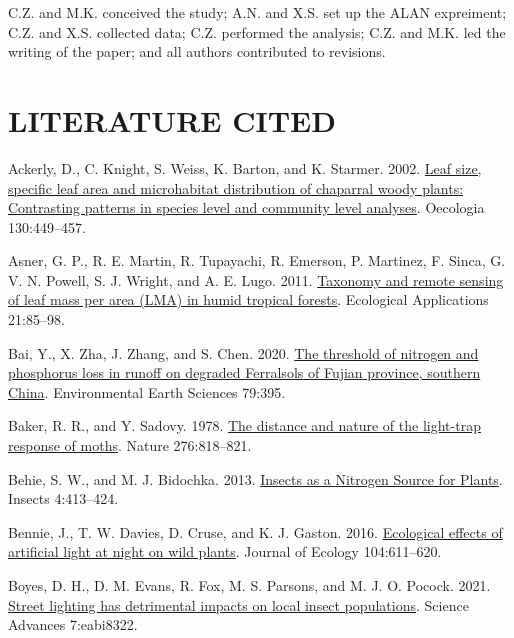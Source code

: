 \documentclass[
  12pt,
  letterpaper,
  DIV=11,
  numbers=noendperiod]{scrartcl}
\newlength{\cslhangindent}
\newlength{\cslentryspacingunit} %
\newenvironment{CSLReferences}[2] %
 {%
  \setlength{\parindent}{0pt}
  \ifodd #1
  \let\oldpar\par
  \def\par{\hangindent=\cslhangindent\oldpar}
  \fi
  \setlength{\parskip}{#2\cslentryspacingunit}
 }%
 {}
\begin{document}
C.Z. and M.K. conceived the study; A.N. and X.S. set up the ALAN
expreiment; C.Z. and X.S. collected data; C.Z. performed the analysis;
C.Z. and M.K. led the writing of the paper; and all authors contributed
to revisions.

\hypertarget{literature-cited}{%
\section{LITERATURE CITED}\label{literature-cited}}

\hypertarget{refs}{}
\begin{CSLReferences}{1}{0}
\leavevmode{}%
Ackerly, D., C. Knight, S. Weiss, K. Barton, and K. Starmer. 2002.
\href{https://doi.org/10.1007/s004420100805}{Leaf size, specific leaf
area and microhabitat distribution of chaparral woody plants:
Contrasting patterns in species level and community level analyses}.
Oecologia 130:449--457.

\leavevmode{}%
Asner, G. P., R. E. Martin, R. Tupayachi, R. Emerson, P. Martinez, F.
Sinca, G. V. N. Powell, S. J. Wright, and A. E. Lugo. 2011.
\href{https://doi.org/10.1890/09-1999.1}{Taxonomy and remote sensing of
leaf mass per area ({LMA}) in humid tropical forests}. Ecological
Applications 21:85--98.

\leavevmode{}%
Bai, Y., X. Zha, J. Zhang, and S. Chen. 2020.
\href{https://doi.org/10.1007/s12665-020-09130-z}{The threshold of
nitrogen and phosphorus loss in runoff on degraded {Ferralsols} of
{Fujian} province, southern {China}}. Environmental Earth Sciences
79:395.

\leavevmode{}%
Baker, R. R., and Y. Sadovy. 1978.
\href{https://doi.org/10.1038/276818a0}{The distance and nature of the
light-trap response of moths}. Nature 276:818--821.

\leavevmode{}%
Behie, S. W., and M. J. Bidochka. 2013.
\href{https://doi.org/10.3390/insects4030413}{Insects as a {Nitrogen
Source} for {Plants}}. Insects 4:413--424.

\leavevmode{}%
Bennie, J., T. W. Davies, D. Cruse, and K. J. Gaston. 2016.
\href{https://doi.org/10.1111/1365-2745.12551}{Ecological effects of
artificial light at night on wild plants}. Journal of Ecology
104:611--620.

\leavevmode{}%
Boyes, D. H., D. M. Evans, R. Fox, M. S. Parsons, and M. J. O. Pocock.
2021. \href{https://doi.org/10.1126/sciadv.abi8322}{Street lighting has
detrimental impacts on local insect populations}. Science Advances
7:eabi8322.


\end{CSLReferences}
\end{document}
